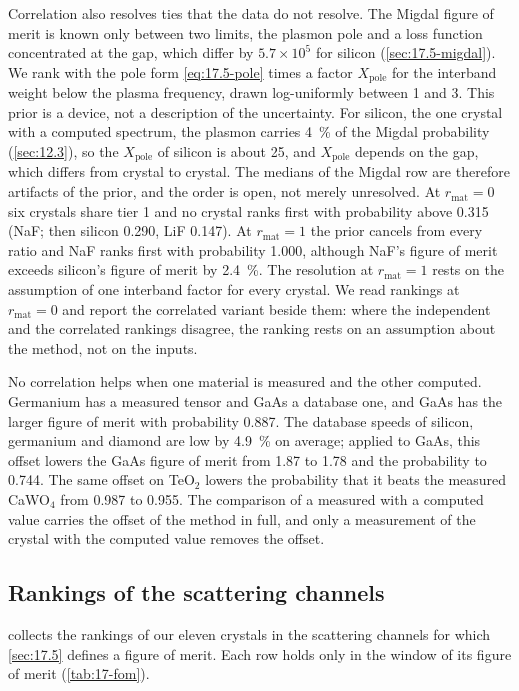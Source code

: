 Correlation also resolves ties that the data do not resolve. The Migdal figure of merit is known only between two limits, the plasmon pole and a loss function concentrated at the gap, which differ by $5.7\times10^5$ for silicon (\cref{sec:17.5-migdal}). We rank with the pole form \cref{eq:17.5-pole} times a factor $X_{\mathrm{pole}}$ for the interband weight below the plasma frequency, drawn log-uniformly between 1 and 3. This prior is a device, not a description of the uncertainty. For silicon, the one crystal with a computed spectrum, the plasmon carries \SI{4}{\percent} of the Migdal probability (\cref{sec:12.3}), so the $X_{\mathrm{pole}}$ of silicon is about 25, and $X_{\mathrm{pole}}$ depends on the gap, which differs from crystal to crystal. The medians of the Migdal row are therefore artifacts of the prior, and the order is open, not merely unresolved. At $r_{\mathrm{mat}} = 0$ six crystals share tier 1 and no crystal ranks first with probability above 0.315 (NaF; then silicon 0.290, LiF 0.147). At $r_{\mathrm{mat}} = 1$ the prior cancels from every ratio and NaF ranks first with probability 1.000, although NaF's figure of merit exceeds silicon's figure of merit by \SI{2.4}{\percent}. The resolution at $r_{\mathrm{mat}} = 1$ rests on the assumption of one interband factor for every crystal. We read rankings at $r_{\mathrm{mat}} = 0$ and report the correlated variant beside them: where the independent and the correlated rankings disagree, the ranking rests on an assumption about the method, not on the inputs.

No correlation helps when one material is measured and the other computed. Germanium has a measured tensor and GaAs a database one, and GaAs has the larger figure of merit with probability 0.887. The database speeds of silicon, germanium and diamond are low by \SI{4.9}{\percent} on average; applied to GaAs, this offset lowers the GaAs figure of merit from 1.87 to 1.78 and the probability to 0.744. The same offset on TeO$_2$ lowers the probability that it beats the measured CaWO$_4$ from 0.987 to 0.955. The comparison of a measured with a computed value carries the offset of the method in full, and only a measurement of the crystal with the computed value removes the offset.

\subsection{Rankings of the scattering channels}\label{sec:17.6-rankings}

 collects the rankings of our eleven crystals in the scattering channels for which \cref{sec:17.5} defines a figure of merit. Each row holds only in the window of its figure of merit (\cref{tab:17-fom}).

